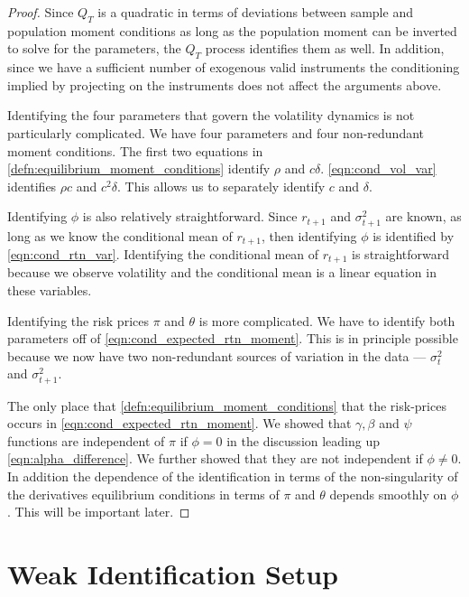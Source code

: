 \documentclass[11pt, letterpaper, twoside, final]{article}
\begin{document}
\begin{proof}
    Since $Q_{T}$ is a quadratic in terms of deviations between sample and population moment conditions as long as
    the population moment can be inverted to solve for the parameters, the $Q_T$ process identifies them as well. 
    In addition, since we have a sufficient number of exogenous valid instruments the conditioning implied by
    projecting on the instruments does not affect the arguments above. 

    Identifying the four parameters that govern the volatility dynamics is not particularly complicated. 
    We have four parameters and four non-redundant moment conditions.
    The first two equations in    \cref{defn:equilibrium_moment_conditions} identify $\rho$ and $c \delta$.
    \cref{eqn:cond_vol_var} identifies $\rho c$ and $c^2 \delta$. 
    This allows us to separately identify $c$ and $\delta$.
    
    Identifying $\phi$ is also relatively straightforward. Since $r_{t+1}$ and $\sigma^2_{t+1}$ are known, as long
    as we know the conditional mean of $r_{t+1}$, then identifying $\phi$ is identified by \cref{eqn:cond_rtn_var}.
    Identifying the conditional mean of $r_{t+1}$ is straightforward because we observe volatility and the
    conditional mean is a linear equation in these variables. 
    

    Identifying the risk prices $\pi$ and $\theta$ is more complicated.
    We have to identify both parameters off of \cref{eqn:cond_expected_rtn_moment}. 
    This is in principle possible because we now have two non-redundant sources of variation in the data ---
    $\sigma^2_t$ and $\sigma^2_{t+1}$.

    The only place that \cref{defn:equilibrium_moment_conditions} that the risk-prices occurs in
    \cref{eqn:cond_expected_rtn_moment}. 
    We showed that $\gamma, \beta$ and $\psi$ functions are independent of $\pi$ if $\phi = 0$ in the discussion
    leading up \cref{eqn:alpha_difference}.
    We further showed that they are not independent if $\phi \neq 0$.
    In addition the dependence of the identification in terms of the non-singularity of the derivatives
    equilibrium conditions in terms of $\pi$ and $\theta$ depends smoothly on $\phi$. 
    This will be important later.
    
\end{proof}


\section{Weak Identification Setup}
\end{document}
